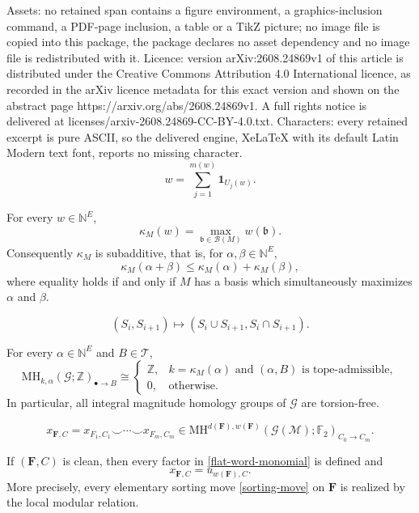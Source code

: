 \documentclass[10pt,a4paper]{amsart}
\newcommand{\B}{\mathcal{B}}
\newcommand{\Ftwo}{\mathbb F_2}
\newcommand{\G}{\mathcal{G}}
\newcommand{\MH}{\mathrm{MH}}
\newcommand{\M}{\mathcal{M}}
\newcommand{\NN}{\mathbb{N}}
\newcommand{\T}{\mathcal{T}}
\newcommand{\ZZ}{\mathbb{Z}}
\newcommand{\bF}{\boldsymbol{F}}
\newcommand{\bb}{\mathfrak{b}}
\newcommand{\one}{\mathbf{1}}
\begin{document}
Assets: no retained span contains a figure environment, a graphics-inclusion command, a PDF-page inclusion, a table or a TikZ picture; no image file is copied into this package, the package declares no asset dependency and no image file is redistributed with it. Licence: version arXiv:2608.24869v1 of this article is distributed under the Creative Commons Attribution 4.0 International licence, as recorded in the arXiv licence metadata for this exact version and shown on the abstract page https://arxiv.org/abs/2608.24869v1. A full rights notice is delivered at licenses/arxiv-2608.24869-CC-BY-4.0.txt. Characters: every retained excerpt is pure ASCII, so the delivered engine, XeLaTeX with its default Latin Modern text font, reports no missing character.
\begin{equation}\label{layercake}
 w=\sum_{j=1}^{m(w)}\one_{U_j(w)}.
\end{equation}

\begin{proposition}\label{kappa-support}
For every $w\in\NN^E$,
\[
\kappa_M(w)=\max_{\bb\in\B(M)}w(\bb).
\]
Consequently $\kappa_M$ is subadditive, that is, for $\alpha,\beta\in\NN^E$,
\[
\kappa_M(\alpha+\beta)\leq\kappa_M(\alpha)+\kappa_M(\beta),
\]
where equality holds if and only if $M$ has a basis which simultaneously maximizes $\alpha$ and $\beta$.
\end{proposition}

\begin{equation}\label{sorting-move}
(S_i,S_{i+1})\longmapsto(S_i\cup S_{i+1},S_i\cap S_{i+1}).
\end{equation}

\begin{theorem}\label{Koizumi-basis}
For every $\alpha\in\NN^E$ and $B\in\T$,
\[
\MH_{k,\alpha}(\G;\ZZ)_{\bullet\to B}\cong\begin{cases}
 \ZZ,&k=\kappa_M(\alpha)\text{ and }(\alpha,B)\text{ is tope-admissible},\\
 0,&\text{otherwise}.
 \end{cases}
\]
In particular, all integral magnitude homology groups of $\G$ are torsion-free.
\end{theorem}

\begin{equation}\label{flat-word-monomial}
x_{\bF,C}=x_{F_1,C_1}\smile\cdots \smile x_{F_m,C_m}\in\MH^{d(\bF),w(\bF)}(\G(\M);\Ftwo)_{C_0\to C_m}.
\end{equation}

\begin{proposition}\label{modular-straightening}
If $(\bF,C)$ is clean, then every factor in \eqref{flat-word-monomial} is defined and
\[
x_{\bF,C}=u_{w(\bF),C}.
\]
More precisely, every elementary sorting move \eqref{sorting-move} on $\bF$ is realized by the local modular relation.
\end{proposition}
\end{document}
